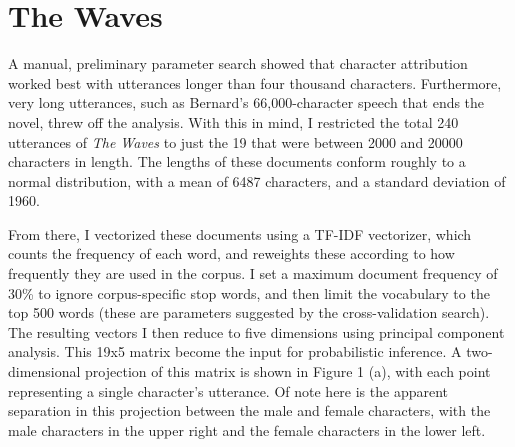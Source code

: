 \documentclass[12pt]{article}
\begin{document}
\section{The Waves}\label{the-waves}

A manual, preliminary parameter search showed that character attribution
worked best with utterances longer than four thousand characters.
Furthermore, very long utterances, such as Bernard's 66,000-character
speech that ends the novel, threw off the analysis. With this in mind, I
restricted the total 240 utterances of \emph{The Waves} to just the 19
that were between 2000 and 20000 characters in length. The lengths of
these documents conform roughly to a normal distribution, with a mean of
6487 characters, and a standard deviation of 1960.

From there, I vectorized these documents using a TF-IDF vectorizer,
which counts the frequency of each word, and reweights these according
to how frequently they are used in the corpus. I set a maximum document
frequency of 30\% to ignore corpus-specific stop words, and then limit
the vocabulary to the top 500 words (these are parameters suggested by
the cross-validation search). The resulting vectors I then reduce to
five dimensions using principal component analysis. This 19x5 matrix
become the input for probabilistic inference. A two-dimensional
projection of this matrix is shown in Figure 1 (a), with each point
representing a single character's utterance. Of note here is the
apparent separation in this projection between the male and female
characters, with the male characters in the upper right and the female
characters in the lower left.
\end{document}
